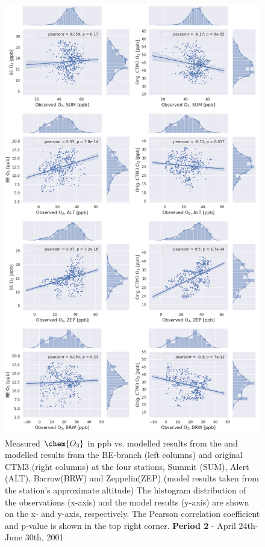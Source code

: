 \begin{figure}[ht]
    \centering
    \includegraphics[width = 0.8\linewidth]{Chapter6_Results/images/Orig_BE_comp/jointplot_AprJune_O3_2001.png}
    \caption{Measured $\chem{O_3}$ in ppb vs. modelled results from the and modelled results from the BE-branch (left columns) and original CTM3 (right columns) at the four stations, Summit (SUM), Alert (ALT), Barrow(BRW) and Zeppelin(ZEP) (model results taken from the station's approximate altitude) The histogram distribution of the observations (x-axis) and the model results (y-axis) are shown on the x- and y-axis, respectively. The Pearson correlation coefficient and p-value is shown in the top right corner. \textbf{Period 2} - April 24th-June 30th, 2001}
    \label{fig:joint_AprMay}
\end{figure}